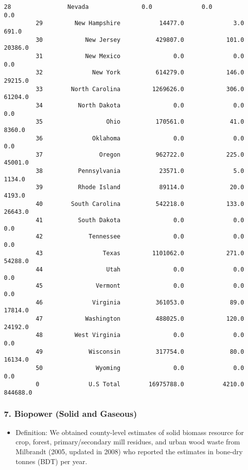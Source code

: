 \documentclass[11pt]{article}
\providecommand{\tightlist}{%
      \setlength{\itemsep}{0pt}\setlength{\parskip}{0pt}}
\begin{document}
\begin{Verbatim}[commandchars=\\\{\}]
         28                Nevada               0.0              0.0               0.0
         29         New Hampshire           14477.0              3.0             691.0
         30            New Jersey          429807.0            101.0           20386.0
         31            New Mexico               0.0              0.0               0.0
         32              New York          614279.0            146.0           29215.0
         33        North Carolina         1269626.0            306.0           61204.0
         34          North Dakota               0.0              0.0               0.0
         35                  Ohio          170561.0             41.0            8360.0
         36              Oklahoma               0.0              0.0               0.0
         37                Oregon          962722.0            225.0           45001.0
         38          Pennsylvania           23571.0              5.0            1134.0
         39          Rhode Island           89114.0             20.0            4193.0
         40        South Carolina          542218.0            133.0           26643.0
         41          South Dakota               0.0              0.0               0.0
         42             Tennessee               0.0              0.0               0.0
         43                 Texas         1101062.0            271.0           54288.0
         44                  Utah               0.0              0.0               0.0
         45               Vermont               0.0              0.0               0.0
         46              Virginia          361053.0             89.0           17814.0
         47            Washington          488025.0            120.0           24192.0
         48         West Virginia               0.0              0.0               0.0
         49             Wisconsin          317754.0             80.0           16134.0
         50               Wyoming               0.0              0.0               0.0
         0              U.S Total        16975788.0           4210.0          844688.0
\end{Verbatim}
            
    \subsubsection{7. Biopower (Solid and
Gaseous)}\label{biopower-solid-and-gaseous}

\begin{itemize}
\tightlist
\item
  Definition: We obtained county-level estimates of solid biomass
  resource for crop, forest, primary/secondary mill residues, and urban
  wood waste from Milbrandt (2005, updated in 2008) who reported the
  estimates in bone-dry tonnes (BDT) per year.
\end{itemize}
\end{document}
